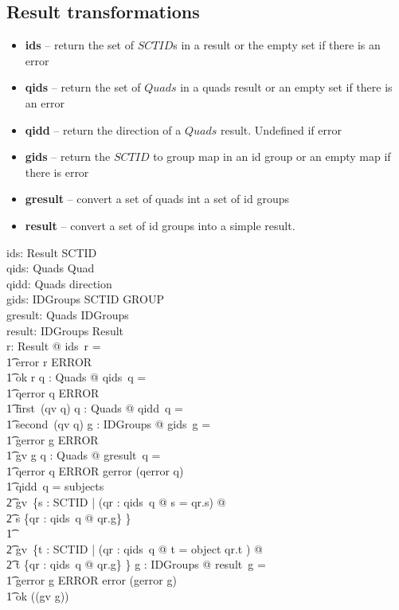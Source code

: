 \documentclass{article}
\begin{document}
\subsection{Result transformations}
\begin{itemize}[noitemsep,nolistsep]
\item \textbf{ids} -- return the set of $SCTID$s in a result or the empty set if there is an error
\item \textbf{qids} -- return the set of $Quads$ in a quads result or an empty set if there is an error
\item \textbf{qidd} -- return the direction of a $Quads$ result.  Undefined if error
\item \textbf{gids} -- return the $SCTID$ to group map in an id group or an empty map if there is error
\item \textbf{gresult} -- convert a set of quads int a set of id groups
\item \textbf{result} -- convert a set of id groups into a simple result.
\end{itemize}
\begin{gendef}
   ids: Result \fun \power SCTID \\
   qids: Quads \fun \power Quad  \\
   qidd: Quads \pfun direction \\
   gids: IDGroups \fun SCTID \fun \power GROUP \\
   gresult: Quads \fun IDGroups \\
   result: IDGroups \fun Result \\
\where
   \forall r: Result @ ids~r = \\
\t1 \IF error \inv r \in ERROR \THEN \emptyset \\
\t1 \ELSE ok \inv r
\also
   \forall q : Quads @ qids~q = \\
\t1 \IF qerror \inv q \in ERROR \THEN \emptyset \\
\t1 \ELSE first~(qv \inv q)
\also
   \forall q : Quads @ qidd~q = \\
\t1 second~(qv \inv q)
\also
   \forall g : IDGroups @ gids~g = \\
\t1 \IF gerror \inv g \in ERROR \THEN \emptyset \\
\t1 \ELSE gv \inv g
\also
   \forall q : Quads @ gresult~q = \\
\t1 \IF qerror  \inv q \in ERROR \THEN gerror (qerror \inv q) \\
\t1 \ELSE \IF qidd~q = subjects \\
\t2 \THEN gv~\{s : SCTID | (\exists qr : qids~q @ s = qr.s) @ \\
\t2 s \mapsto \{qr : qids~q @ qr.g\} \} \\
\t1 \ELSE \\
\t2 gv~\{t : SCTID | (\exists qr : qids~q @ t = object \inv qr.t ) @ \\
\t2 t \mapsto \{qr : qids~q @ qr.g\} \} 
\also
   \forall g : IDGroups @ result~g = \\
\t1 \IF gerror \inv g \in ERROR \THEN error (gerror \inv g) \\
\t1 \ELSE ok (\dom (gv \inv g))
\end{gendef}
\end{document}

